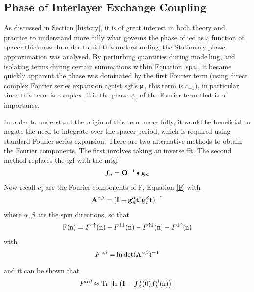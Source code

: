 \documentclass[a4paper, 12pt]{article}
\begin{document}
\subsection{Phase of Interlayer Exchange Coupling}
\par As discussed in Section \ref{history}, it is of great interest in both theory and practice to understand more fully what governs the phase of \gls{iec} as a function of spacer thickness. In order to aid this understanding, 
the Stationary phase approximation was analysed.
By perturbing quantities during modelling, and isolating terms during certain summations within Equation \eqref{spa}, it became quickly apparent the phase was dominated by the first Fourier term (using direct complex Fourier series expansion agaist \gls{sgf}'s $\bf g$, this term is $c_{-1}$), in particular since this term is complex, it is the phase $\psi_s$ of the Fourier term that is of importance.
\par In order to understand the origin of this term more fully, it would be beneficial to negate the need to integrate over the spacer period, which is required using standard Fourier series expansion.
There are two alternative methods to obtain the Fourier components. The first involves taking an inverse \gls{fft}.
The second method replaces the \gls{sgf} with the \gls{mtgf} 
\begin{equation}\label{fn}
	\bm f_n = {\bf O}^{-1}\bullet {\bf g}_n
\end{equation}
Now recall $c_s$ are the Fourier components of F, Equation \eqref{F} with
\begin{equation}
	{\bf A}^{\alpha\beta} = ({\bf I - g}_{\scriptscriptstyle R}^{\alpha}{\bf t}^\dag {\bf g}_{\scriptscriptstyle L}^{\beta}{\bf t})^{-1}
\end{equation}
where $\alpha, \beta$ are the spin directions, so that
\begin{equation}
	{\rm F(n)} = F^{\uparrow\uparrow}({\rm n})+F^{\downarrow\downarrow}({\rm n}) - F^{\uparrow\downarrow}({\rm n})-F^{\downarrow\uparrow}({\rm n})
\end{equation}
with
\begin{equation}
	F^{\alpha\beta} = \ln\det({\bf A}^{\alpha\beta})^{-1}
\end{equation}
and it can be shown that\textsuperscript{\textcolor{blue}{\cite{com}}}
\begin{equation}\label{ftaylor}
	F^{\alpha\beta} \approx {\rm Tr}\left[\ln\left({\bf I}-\bm f_{\scriptscriptstyle R}^{\alpha}(0)\bm f_{\scriptscriptstyle L}^{\beta}({\rm n})\right)\right]
\end{equation}
\end{document}
